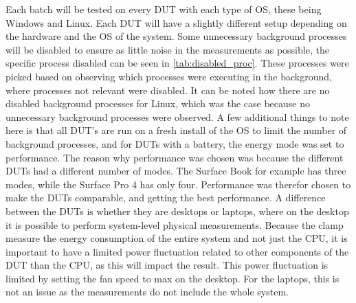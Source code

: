 Each batch will be tested on every DUT with each type of OS, these being Windows and Linux. Each DUT will have a slightly different setup depending on the hardware and the OS of the system. Some unnecessary background processes will be disabled to ensure as little noise in the measurements as possible\cite[]{sestoft2013microbenchmarks}, the specific process disabled can be seen in \cref{tab:disabled_proc}. These processes were picked based on observing which processes were executing in the background, where processes not relevant were disabled. It can be noted how there are no disabled background processes for Linux, which was the case because no unnecessary background processes were observed. A few additional things to note here is that all DUT's are run on a fresh install of the OS to limit the number of background processes, and for DUTs with a battery, the energy mode was set to performance. The reason why performance was chosen was because the different DUTs had a different number of modes. The Surface Book for example has three modes, while the Surface Pro 4 has only four. Performance was therefor chosen to make the DUTs comparable, and getting the best performance. A difference between the DUTs is whether they are desktops or laptops, where on the desktop it is possible to perform system-level physical measurements. Because the clamp measure the energy consumption of the entire system and not just the CPU, it is important to have a limited power fluctuation related to other components of the DUT than the CPU, as this will impact the result. This power fluctuation is limited by setting the fan speed to max on the desktop. For the laptops, this is not an issue as the measurements do not include the whole system.


